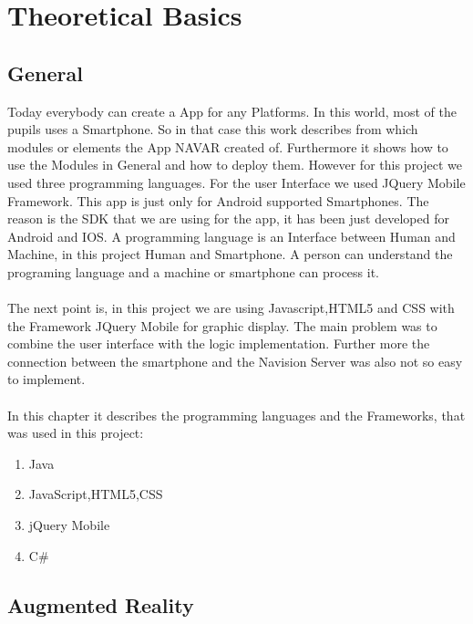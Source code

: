 \chapter{Theoretical Basics}
\section{General}
Today everybody can create a App for any Platforms. In this world, most of the pupils uses a Smartphone. So in that case this work describes from which modules or elements  the App NAVAR created of.  Furthermore it shows how to use the Modules in General and how to deploy them. However for this project we used three programming languages. For the user Interface we used JQuery Mobile Framework. This app is just only for Android supported Smartphones. The reason is the SDK that  we are using for the app, it has been just developed for Android and IOS.  A programming language is an Interface between Human and Machine, in this project Human and Smartphone. A person can understand the programing language and a machine or smartphone can process it. 
\\\\
The next point is, in this project we are using Javascript,HTML5 and CSS with the Framework JQuery Mobile for graphic display. The main problem was to combine the user interface with the logic implementation. Further more the connection between the smartphone and the Navision Server was also not so easy to implement.
\\\\
In this chapter it describes the programming languages and the Frameworks, that was used in this project:
\begin{enumerate}
\item Java
\item JavaScript,HTML5,CSS
\item jQuery Mobile
\item C\#
\end{enumerate}
\newpage
\section{Augmented Reality}
